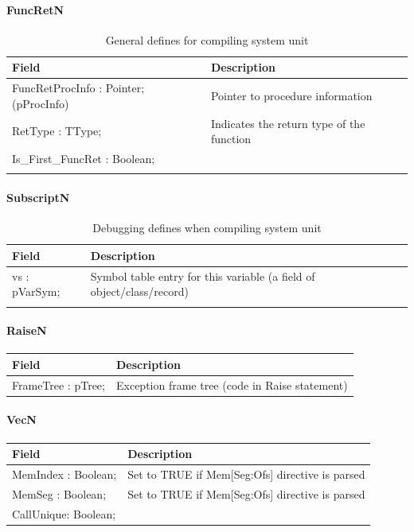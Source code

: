 \documentclass [a4paper,12pt]{article}
\begin{document}
\paragraph{FuncRetN}\mbox{}

\begin{longtable}{|l|p{10cm}|}
\hline
Field	& Description \\
\hline
\endhead
\hline
\endfoot
\textsf{FuncRetProcInfo : Pointer; (pProcInfo)}&
	Pointer to procedure information  \\
\textsf{RetType : TType;}& Indicates the return type of the function \\
\textsf{Is{\_}First{\_}FuncRet : Boolean;}&  \\
\hline
\caption{General defines for compiling system unit}
\label{tab18}
\end{longtable}

\paragraph{SubscriptN}\mbox{}

\begin{longtable}{|l|p{10cm}|}
\hline
Field	& Description \\
\hline
\endhead
\hline
\endfoot
\textsf{vs : pVarSym;}&
	Symbol table entry for this variable (a field of
	object/class/record) \\
\hline
\caption{Debugging defines when compiling system unit}
\end{longtable}

\paragraph{RaiseN}\mbox{}

\begin{longtable}{|l|p{10cm}|}
\hline
Field	& Description \\
\hline
\endhead
\hline
\endfoot
\textsf{FrameTree : pTree;} & Exception frame tree (code in Raise statement)
\end{longtable}

\paragraph{VecN}\mbox{}

\begin{longtable}{|l|p{10cm}|}
\hline
Field	& Description \\
\hline
\endhead
\hline
\endfoot
\textsf{MemIndex  : Boolean;} & Set to TRUE if Mem[Seg:Ofs] directive is parsed \\
\textsf{MemSeg 	  : Boolean;} & Set to TRUE if Mem[Seg:Ofs] directive is parsed \\
\textsf{CallUnique: Boolean;} &
\label{tab21}
\end{longtable}
\end{document}
